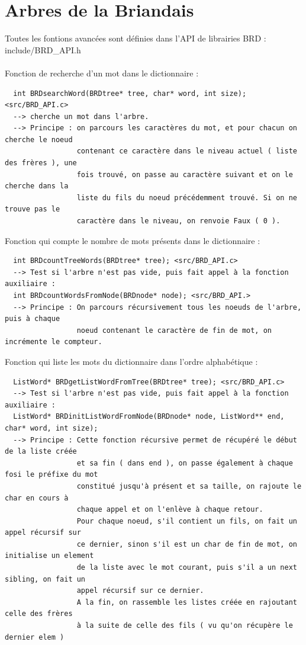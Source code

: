 \documentclass[a4paper,8pt]{report}
\begin{document}
\section*{Arbres de la Briandais}\label{sec:name}
Toutes les fontions avancées sont définies dans l'API de librairies BRD : include/BRD\_API.h\\ \\
Fonction de recherche d'un mot dans le dictionnaire :
\begin{verbatim}
  int BRDsearchWord(BRDtree* tree, char* word, int size); <src/BRD_API.c>
  --> cherche un mot dans l'arbre.
  --> Principe : on parcours les caractères du mot, et pour chacun on cherche le noeud
                 contenant ce caractère dans le niveau actuel ( liste des frères ), une
                 fois trouvé, on passe au caractère suivant et on le cherche dans la 
                 liste du fils du noeud précédemment trouvé. Si on ne trouve pas le 
                 caractère dans le niveau, on renvoie Faux ( 0 ).
\end{verbatim}
Fonction qui compte le nombre de mots présents dans le dictionnaire :
\begin{verbatim}
  int BRDcountTreeWords(BRDtree* tree); <src/BRD_API.c>
  --> Test si l'arbre n'est pas vide, puis fait appel à la fonction auxiliaire :
  int BRDcountWordsFromNode(BRDnode* node); <src/BRD_API.>
  --> Principe : On parcours récursivement tous les noeuds de l'arbre, puis à chaque
                 noeud contenant le caractère de fin de mot, on incrémente le compteur.
\end{verbatim}
Fonction qui liste les mots du dictionnaire dans l'ordre alphabétique :
\begin{verbatim}
  ListWord* BRDgetListWordFromTree(BRDtree* tree); <src/BRD_API.c>
  --> Test si l'arbre n'est pas vide, puis fait appel à la fonction auxiliaire :
  ListWord* BRDinitListWordFromNode(BRDnode* node, ListWord** end, char* word, int size);
  --> Principe : Cette fonction récursive permet de récupéré le début de la liste créée 
                 et sa fin ( dans end ), on passe également à chaque fosi le préfixe du mot
                 constitué jusqu'à présent et sa taille, on rajoute le char en cours à 
                 chaque appel et on l'enlève à chaque retour.
                 Pour chaque noeud, s'il contient un fils, on fait un appel récursif sur
                 ce dernier, sinon s'il est un char de fin de mot, on initialise un element
                 de la liste avec le mot courant, puis s'il a un next sibling, on fait un
                 appel récursif sur ce dernier.
                 A la fin, on rassemble les listes créée en rajoutant celle des frères
                 à la suite de celle des fils ( vu qu'on récupère le dernier elem )
\end{verbatim}
\end{document}
